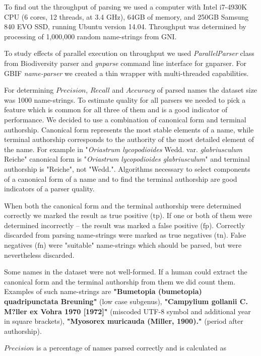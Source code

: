 \documentclass{bmcart}
\begin{document}
To find out the throughput of parsing we used a computer with Intel i7-4930K
CPU (6 cores, 12 threads, at 3.4 GHz), 64GB of memory, and 250GB Samsung 840
EVO SSD, running Ubuntu version 14.04. Throughput was determined by processing
of 1,000,000 random name-strings from GNI.

To study effects of parallel execution on throughput we used
\textit{ParallelParser} class from Biodiversity parser and \textit{gnparse}
command line interface for gnparser. For GBIF \textit{name-parser} we created a
thin wrapper with multi-threaded capabilities\cite{gbifparser}.

For determining $Precision$, $Recall$ and $Accuracy$ of parsed names the
dataset size was 1000 name-strings. To estimate quality for all parsers we
needed to pick a feature which is common for all three of them and is a good
indicator of performance.  We decided to use a combination of canonical form
and terminal authorship.  Canonical form represents the most stable elements
of a name, while terminal authorship corresponds to the authority of the most
detailed element of the name. For example in "\textit{Oriastrum lycopodioides}
Wedd.  var.  \textit{glabriusculum} Reiche" canonical form is
"\textit{Oriastrum lycopodioides glabriusculum}" and terminal authorship is
"Reiche", not "Wedd.".  Algorithms necessary to select components of a
canonical form of a name and to find the terminal authorship are good
indicators of a parser quality.

When both the canonical form and the terminal authorship were determined
correctly we marked the result as true positive ($\text{tp}$).  If one or both
of them were determined incorrectly -- the result was marked a false positive
($\text{fp}$). Correctly discarded from parsing name-strings were marked as
true negatives ($\text{tn}$). False negatives ($\text{fn}$) were "suitable"
name-strings which should be parsed, but were nevertheless discarded.

Some names in the dataset were not well-formed. If a human could extract the
canonical form and the terminal authorship from them we did count them.
Examples of such name-strings are \textbf{"Bumetopia (bumetopia)
quadripunctata Breuning"} (low case subgenus), \textbf{"Campylium gollanii C.
M?ller ex Vohra 1970 [1972]"} (miscoded UTF-8 symbol and additional year in
square brackets), \textbf{"Myosorex muricauda (Miller, 1900)."} (period after
authorship).

$Precision$ is a percentage of names parsed correctly and is calculated as
\end{document}
